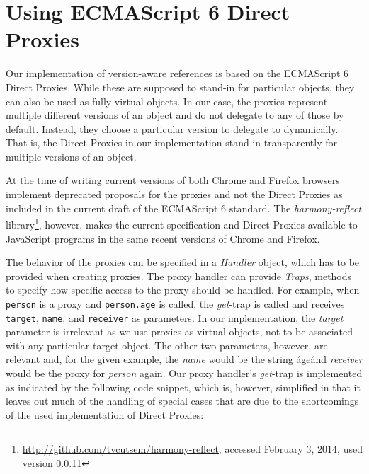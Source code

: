 \section{Using ECMAScript 6 Direct Proxies}

Our implementation of version-aware references is based on the ECMAScript 6 Direct Proxies.
While these are supposed to stand-in for particular objects, they can also be used as fully virtual objects.
In our case, the proxies represent multiple different versions of an object and do not delegate to any of those by default.
Instead, they choose a particular version to delegate to dynamically.
That is, the Direct Proxies in our implementation stand-in transparently for multiple versions of an object.

At the time of writing current versions of both Chrome and Firefox browsers implement deprecated proposals for the proxies and not the Direct Proxies as included in the current draft of the ECMAScript 6 standard.
The \emph{harmony-reflect} library\footnote{\url{http://github.com/tvcutsem/harmony-reflect}, accessed February 3, 2014, used version 0.0.11}, however, makes the current specification and Direct Proxies available to JavaScript programs in the same recent versions of Chrome and Firefox.

The behavior of the proxies can be specified in a \emph{Handler} object, which has to be provided when creating proxies.
The proxy handler can provide \emph{Traps}, methods to specify how specific access to the proxy should be handled.
For example, when \lstinline{person} is a proxy and \lstinline{person.age} is called, the \emph{get}-trap is called and receives \lstinline{target}, \lstinline{name}, and \lstinline{receiver} as parameters.
In our implementation, the \emph{target} parameter is irrelevant as we use proxies as virtual objects, not to be associated with any particular target object.
The other two parameters, however, are relevant and, for the given example, the \emph{name} would be the string \'age\' and \emph{receiver} would be the proxy for \emph{person} again.
Our proxy handler's \emph{get}-trap is implemented as indicated by the following code snippet, which is, however, simplified in that it leaves out much of the handling of special cases that are due to the shortcomings of the used implementation of Direct Proxies:

\iffalse
\begin{verbatim}\fi
\begin{code}{}{}
get: function(.., name, receiver) {

    var version = this.currentVersion();
    
    // proxy meta information and other special cases..
    if (name === 'isProxy') {
    // ...
    
    result = version[name];
    
    return this.ensureProxied(result);
}
\end{code}
\iffalse
\end{verbatim}\fi

